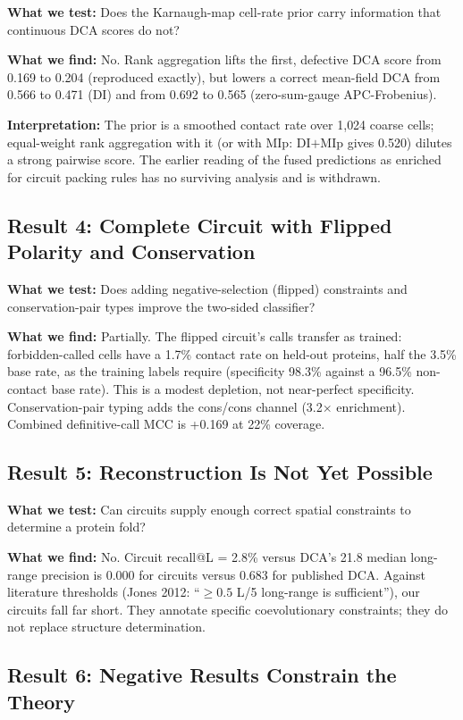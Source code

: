 \textbf{What we test:} Does the Karnaugh-map cell-rate prior carry information
that continuous DCA scores do not?

\textbf{What we find:} No.  Rank aggregation lifts the first, defective DCA
score from 0.169 to 0.204 (reproduced exactly), but lowers a correct
mean-field DCA from 0.566 to 0.471 (DI) and from 0.692 to 0.565
(zero-sum-gauge APC-Frobenius).

\textbf{Interpretation:} The prior is a smoothed contact rate over 1{,}024
coarse cells; equal-weight rank aggregation with it (or with MIp: DI$+$MIp
gives 0.520) dilutes a strong pairwise score.  The earlier reading of the
fused predictions as enriched for circuit packing rules has no surviving
analysis and is withdrawn.

\subsection{Result 4: Complete Circuit with Flipped Polarity and Conservation}

\textbf{What we test:} Does adding negative-selection (flipped) constraints
and conservation-pair types improve the two-sided classifier?

\textbf{What we find:} Partially.  The flipped circuit's calls transfer as
trained: forbidden-called cells have a 1.7\% contact rate on held-out proteins,
half the 3.5\% base rate, as the training labels require (specificity 98.3\%
against a 96.5\% non-contact base rate).  This is a modest depletion, not
near-perfect specificity.  Conservation-pair typing adds the cons/cons channel (3.2$\times$
enrichment).  Combined definitive-call MCC is +0.169 at 22\% coverage.

\subsection{Result 5: Reconstruction Is Not Yet Possible}

\textbf{What we test:} Can circuits supply enough correct spatial constraints
to determine a protein fold?

\textbf{What we find:} No.  Circuit recall@L = 2.8\% versus DCA's 21.8%
median long-range precision is 0.000 for circuits versus 0.683 for published
DCA.  Against literature thresholds (Jones 2012: ``$\geq 0.5$ L/5 long-range
is sufficient''), our circuits fall far short.  They annotate specific
coevolutionary constraints; they do not replace structure determination.

\subsection{Result 6: Negative Results Constrain the Theory}

